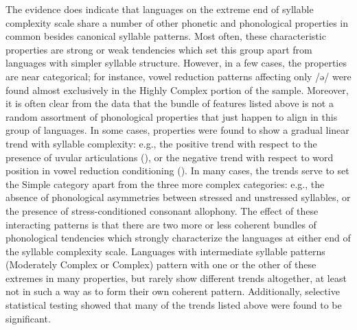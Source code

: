   The evidence does indicate that languages on the extreme end of syllable complexity scale share a number of other phonetic and phonological properties in common besides canonical syllable patterns. Most often, these characteristic properties are strong or weak tendencies which set this group apart from languages with simpler syllable structure. However, in a few cases, the properties are near categorical; for instance, vowel reduction patterns affecting only /ə/ were found almost exclusively in the Highly Complex portion of the sample. Moreover, it is often clear from the data that the bundle of features listed above is not a random assortment of phonological properties that just happen to align in this group of languages. In some cases, properties were found to show a gradual linear trend with syllable complexity: e.g., the positive trend with respect to the presence of uvular articulations (), or the negative trend with respect to word position in vowel reduction conditioning (). In many cases, the trends serve to set the Simple category apart from the three more complex categories: e.g., the absence of phonological asymmetries between stressed and unstressed syllables, or the presence of stress-conditioned consonant allophony. The effect of these interacting patterns is that there are two more or less coherent bundles of phonological tendencies which strongly characterize the languages at either end of the syllable complexity scale. Languages with intermediate syllable patterns (Moderately Complex or Complex) pattern with one or the other of these extremes in many properties, but rarely show different trends altogether, at least not in such a way as to form their own coherent pattern. Additionally, selective statistical testing showed that many of the trends listed above were found to be significant.



